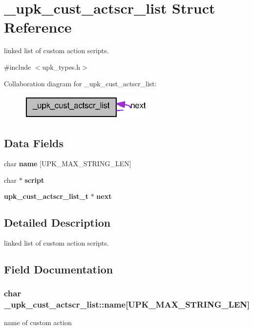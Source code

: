 \section{\_\-upk\_\-cust\_\-actscr\_\-list Struct Reference}
\label{struct__upk__cust__actscr__list}


linked list of custom action scripts.  




{\ttfamily \#include $<$upk\_\-types.h$>$}



Collaboration diagram for \_\-upk\_\-cust\_\-actscr\_\-list:\nopagebreak
\begin{figure}[H]
\begin{center}
\leavevmode
\includegraphics[width=191pt]{struct__upk__cust__actscr__list__coll__graph}
\end{center}
\end{figure}
\subsection*{Data Fields}
\begin{DoxyCompactItemize}
\item 
char {\bf name} [UPK\_\-MAX\_\-STRING\_\-LEN]
\item 
char $\ast$ {\bf script}
\item 
{\bf upk\_\-cust\_\-actscr\_\-list\_\-t} $\ast$ {\bf next}
\end{DoxyCompactItemize}


\subsection{Detailed Description}
linked list of custom action scripts. 

\subsection{Field Documentation}
\subsubsection[{name}]{\setlength{\rightskip}{0pt plus 5cm}char {\bf \_\-upk\_\-cust\_\-actscr\_\-list::name}[UPK\_\-MAX\_\-STRING\_\-LEN]}\label{struct__upk__cust__actscr__list_a9c057c0eab2ea9e1dc662af85a3110da}
name of custom action 
